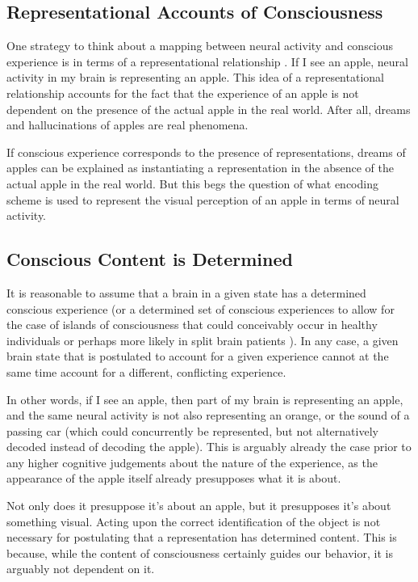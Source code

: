 \documentclass[11pt]{article}
\begin{document}
\subsection{Representational Accounts of Consciousness}

One strategy to think about a mapping between neural activity and conscious experience is in terms of a representational relationship \cite{lycan2019}. If I see an apple, neural activity in my brain is representing an apple. This idea of a representational relationship accounts for the fact that the experience of an apple is not dependent on the presence of the actual apple in the real world. After all, dreams and hallucinations of apples are real phenomena.

If conscious experience corresponds to the presence of representations, dreams of apples can be explained as instantiating a representation in the absence of the actual apple in the real world. But this begs the question of what encoding scheme is used to represent the visual perception of an apple in terms of neural activity.

\subsection{Conscious Content is Determined}

It is reasonable to assume that a brain in a given state has a determined conscious experience (or a determined set of conscious experiences to allow for the case of islands of consciousness that could conceivably occur in healthy individuals or perhaps more likely in split brain patients \cite{bayne2020}). In any case, a given brain state that is postulated to account for a given experience cannot at the same time account for a different, conflicting experience.

In other words, if I see an apple, then part of my brain is representing an apple, and the same neural activity is not also representing an orange, or the sound of a passing car (which could concurrently be represented, but not alternatively decoded instead of decoding the apple). This is arguably already the case prior to any higher cognitive judgements about the nature of the experience, as the appearance of the apple itself already presupposes what it is about.

Not only does it presuppose it's about an apple, but it presupposes it's about something visual. Acting upon the correct identification of the object is not necessary for postulating that a representation has determined content. This is because, while the content of consciousness certainly guides our behavior, it is arguably not dependent on it.
\end{document}
